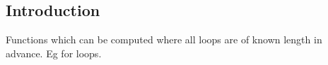 
\subsection{Introduction}

Functions which can be computed where all loops are of known length in advance. Eg for loops.

